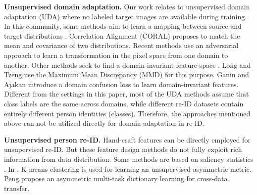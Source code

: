 \documentclass[10pt,twocolumn,letterpaper]{article}
\begin{document}
\textbf{Unsupervised domain adaptation.}
Our work relates to unsupervised domain adaptation (UDA) where no labeled target images are available during training.
In this community, some methods aim to learn a mapping between source and target distributions \cite{DBLP:conf/eccv/SaenkoKFD10, DBLP:conf/cvpr/GongSSG12,DBLP:conf/iccv/FernandoHST13, DBLP:conf/aaai/SunFS16}.  Correlation Alignment (CORAL) \cite{DBLP:conf/aaai/SunFS16} proposes to match the mean and covariance of two distributions. Recent methods \cite{cycledomain, DBLP:journals/corr/BousmalisSDEK16, DBLP:conf/nips/LiuT16} use an adversarial approach to learn a transformation in the pixel space from one domain to another.
Other methods seek to find a domain-invariant feature space \cite{DBLP:journals/corr/abs-1709-10190, DBLP:conf/cvpr/LongD0SGY13, DBLP:conf/icml/GaninL15, DBLP:conf/icml/LongC0J15, DBLP:journals/corr/TzengHZSD14, DBLP:journals/jmlr/GaninUAGLLML16, DBLP:journals/corr/AjakanGLLM14}. Long \etal \cite{DBLP:conf/icml/LongC0J15} and Tzeng \etal \cite{DBLP:journals/corr/TzengHZSD14} use the Maximum Mean Discrepancy (MMD) \cite{MMD} for this purpose. Ganin \etal \cite{DBLP:journals/jmlr/GaninUAGLLML16} and Ajakan \etal \cite{DBLP:journals/corr/AjakanGLLM14} introduce a domain confusion loss to learn domain-invariant features. 
Different from the settings in this paper, most of the UDA methods assume that class labels  are the same across domains, while different re-ID datasets contain entirely different person identities (classes). Therefore, the approaches mentioned above can not be utilized directly for domain adaptation in re-ID.

\textbf{Unsupervised person re-ID.}
Hand-craft features \cite{DBLP:journals/ivc/MaSJ14,DBLP:conf/eccv/GrayT08,DBLP:conf/cvpr/FarenzenaBPMC10,DBLP:conf/cvpr/MatsukawaOSS16,DBLP:conf/cvpr/LiaoHZL15,DBLP:conf/iccv/ZhengSTWWT15} can be directly employed for unsupervised re-ID. But these feature design methods do not fully exploit rich information from data distribution. 
Some methods are based on saliency statistics \cite{DBLP:conf/cvpr/ZhaoOW13,DBLP:conf/bmvc/WangGX14}. In \cite{CAMEL}, K-means clustering is used for learning an unsupervised asymmetric metric. 
Peng \etal \cite{DBLP:conf/cvpr/PengXWPGHT16} propose an asymmetric multi-task dictionary learning for cross-data transfer.
\end{document}
